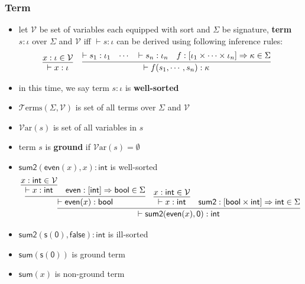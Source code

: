 \documentclass[12pt,aspectratio=169]{beamer}
\newcommand{\m}[1]{\mathsf{#1}}
\newcommand{\VV}{\mathcal{V}}
\newcommand{\TT}{\mathcal{T}}
\newcommand{\Var}{\mathcal{V}\mathrm{ar}}
\newcommand{\Terms}{\TT\mathrm{erms}}
\begin{document}
\begin{frame}
    \frametitle{Term}
    \begin{definition}[term]
        \begin{itemize}
        \item let $\VV$ be set of variables each equipped with sort
        and $\Sigma$ be signature,
        \textbf{term} $s : \iota$ over $\Sigma$ and $\VV$ iff
        $\vdash s : \iota$ can be derived using following inference rules:
        \begin{align*}
            \infer{\vdash x : \iota}{x : \iota \in \VV} \;\;\;\;
                & \infer{\vdash f(s_1,\cdots, s_n) : \kappa}
                    {\vdash s_1 : \iota_1 & \cdots & \vdash s_n : \iota_n
                    & f:[\iota_1 \times \cdots \times \iota_n]
                    \Rightarrow \kappa \in \Sigma}
        \end{align*}
        \item in this time, we say term $s : \iota$ is \textbf{well-sorted}
        \item $\Terms(\Sigma, \VV)$ is set of all terms over $\Sigma$ and $\VV$
        \item $\Var(s)$ is set of all variables in $s$
        \item term $s$ is \textbf{ground} if $\Var(s) = \emptyset$
        \end{itemize}
    \end{definition}
\end{frame}


\begin{frame}
    \begin{example}
        \begin{itemize}
        \item $\m{sum2}(\m{even}(x), x) : \m{int}$ is well-sorted
        {\small
            \begin{align*}
                \infer{\vdash \m{sum2}(\m{even}(x), \m{0}) : \m{int}}
                {\infer{\vdash \m{even}(x) : \m{bool}}
                    {\infer{\vdash x : \m{int}}{x : \m{int} \in \VV} & \m{even} : [\m{int}] \Rightarrow \m{bool} \in \Sigma}
                & \infer{\vdash x : \m{int}}{x : \m{int} \in \VV}
                & \m{sum2} : [\m{bool} \times \m{int}] \Rightarrow \m{int} \in \Sigma
                }
            \end{align*}
        }
        \item $\m{sum2}(\m{s}(\m{0}), \m{false}) : \m{int}$ is ill-sorted
        \item $\m{sum}(\m{s}(\m{0}))$ is ground term
        \item $\m{sum}(x)$ is non-ground term
        \end{itemize}
    \end{example}
\end{frame}
\end{document}
